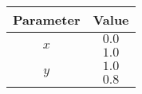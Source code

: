 \begin{tabular}{|c|c|}
\hline
\textbf{Parameter} &\textbf{Value}\\
    \hline
    \multirow{2}{*}{$x$} &  $0.0$\\
   \cline{2-2}
   & $1.0$ \\
   \hline
   \multirow{2}{*}{$y$} & $1.0$\\
   \cline{2-2}
   & $0.8$\\
   \hline
\end{tabular}
